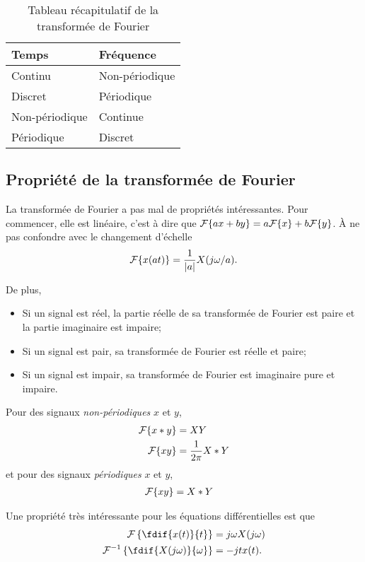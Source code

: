 \begin{table}
  \centering
  \begin{tabular}{|l|l|}
    \hline
    \textbf{Temps} & \textbf{Fréquence}\\
    \hline
    Continu & Non-périodique\\
    \hline
    Discret & Périodique\\
    \hline
    Non-périodique & Continue\\
    \hline
    Périodique & Discret\\
    \hline
  \end{tabular}
  \caption{Tableau récapitulatif de la transformée de Fourier}
  \label{tab:recap_fourier}
\end{table}

\subsection{Propriété de la transformée de Fourier}
La transformée de Fourier a pas mal de propriétés intéressantes.
Pour commencer, elle est linéaire, c'est à dire que
$\mathcal{F}\{ax + by\} = a\mathcal{F}\{x\} + b\mathcal{F}\{y\}$.
À ne pas confondre avec le changement d'échelle
\[ \mathcal{F}\{x(at)\} = \frac{1}{|a|}X(j\omega/a). \]

De plus,
\begin{itemize}
  \item Si un signal est réel,
    la partie réelle de sa transformée de Fourier est paire et
    la partie imaginaire est impaire;
  \item Si un signal est pair, sa transformée de Fourier est réelle et paire;
  \item Si un signal est impair,
    sa transformée de Fourier est imaginaire pure et impaire.
\end{itemize}

Pour des signaux \emph{non-périodiques} $x$ et $y$,
\begin{align*}
  \mathcal{F}\{x * y\} & = X Y\\
  \mathcal{F}\{xy\} & = \frac{1}{2\pi}X * Y
\end{align*}
et pour des signaux \emph{périodiques} $x$ et $y$,
\begin{align*}
  \mathcal{F}\{xy\} & = X * Y
\end{align*}

Une propriété très intéressante pour les équations différentielles est que
\begin{align*}
  \fourier\left\{\fdif{x(t)}{t}\right\} & = j\omega X(j\omega)\\
  \fourier^{-1}\left\{\fdif{X(j\omega)}{\omega}\right\} & =
  -jtx(t).
\end{align*}

